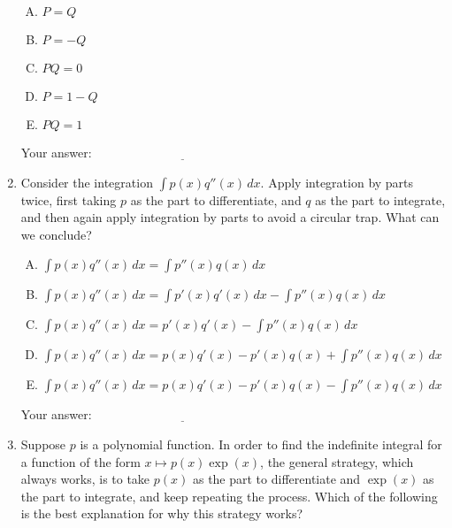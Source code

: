 \documentclass[10pt]{amsart}
\begin{document}
\begin{enumerate}
  \begin{enumerate}[(A)]
  \item $P = Q$
  \item $P = -Q$
  \item $PQ = 0$
  \item $P = 1 - Q$
  \item $PQ = 1$
  \end{enumerate}

  \vspace{0.05in}
  Your answer: $\underline{\qquad\qquad\qquad\qquad\qquad\qquad\qquad}$
  \vspace{0.05in}

\item Consider the integration $\int p(x) q''(x) \,
  dx$. Apply integration by parts twice, first taking
  $p$ as the part to differentiate, and $q$ as
  the part to integrate, and then again apply integration by parts to
  avoid a circular trap. What can we conclude?

  \begin{enumerate}[(A)]
  \item $\int p(x) q''(x) \, dx = \int p''(x) q(x) \, dx$
  \item $\int p(x) q''(x) \, dx = \int p'(x) q'(x) \, dx - \int p''(x) q(x) \, dx$
  \item $\int p(x)q''(x) \,dx = p'(x)q'(x) - \int p''(x) q(x)\, dx$
  \item $\int p(x)q''(x) \,dx = p(x)q'(x) - p'(x)q(x) + \int p''(x) q(x)\, dx$
  \item $\int p(x)q''(x) \,dx = p(x)q'(x) - p'(x)q(x) - \int p''(x) q(x)\, dx$
  \end{enumerate}

  \vspace{0.05in}
  Your answer: $\underline{\qquad\qquad\qquad\qquad\qquad\qquad\qquad}$
  \vspace{0.05in}

\item Suppose $p$ is a polynomial function. In order to
  find the indefinite integral for a function of the form $x
  \mapsto p(x)\exp(x)$, the general strategy, which always
  works, is to take $p(x)$ as the part to differentiate and
  $\exp(x)$ as the part to integrate, and keep repeating
  the process. Which of the following is the best explanation for why
  this strategy works?


\end{enumerate}
\end{document}
